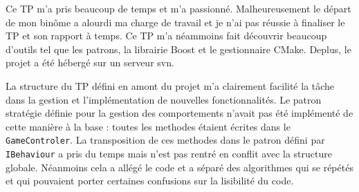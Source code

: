 Ce TP m'a pris beaucoup de temps et m'a passionné. Malheureusement le départ de mon binôme a alourdi ma charge de travail et je n'ai pas réussie à finaliser le TP et son rapport à temps.
Ce TP m'a néammoins fait découvrir beaucoup d'outils tel que les patrons, la librairie Boost et le gestionnaire CMake. Deplus, le projet a été hébergé sur un serveur svn.

La structure du TP défini en amont du projet m'a clairement facilité la tâche dans la gestion et l'implémentation de nouvelles fonctionnalités. Le patron stratégie définie pour la gestion des comportements n'avait pas été implémenté de cette manière à la base : toutes les methodes étaient écrites dans le \verb$GameControler$. La transposition de ces methodes dans le patron défini par \verb$IBehaviour$ a pris du temps mais n'est pas rentré en conflit avec la structure globale. Néanmoins cela a allégé le code et a séparé des algorithmes qui se répétés et qui pouvaient porter certaines confusions sur la lisibilité du code.